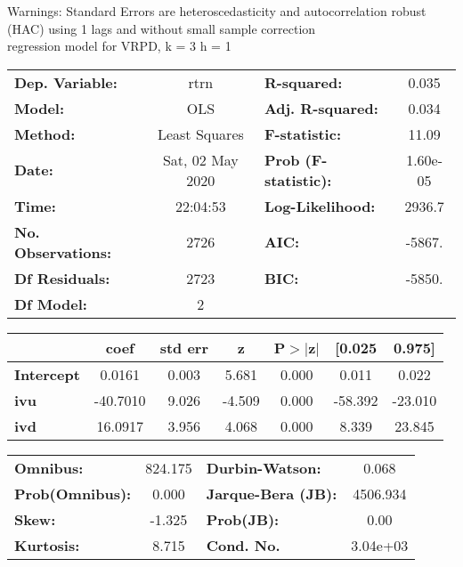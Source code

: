 Warnings: \newline
 [1] Standard Errors are heteroscedasticity and autocorrelation robust (HAC) using 1 lags and without small sample correction\\ 

regression model for VRPD, k = 3 h = 1\begin{center}
\begin{tabular}{lclc}
\toprule
\textbf{Dep. Variable:}    &       rtrn       & \textbf{  R-squared:         } &     0.035   \\
\textbf{Model:}            &       OLS        & \textbf{  Adj. R-squared:    } &     0.034   \\
\textbf{Method:}           &  Least Squares   & \textbf{  F-statistic:       } &     11.09   \\
\textbf{Date:}             & Sat, 02 May 2020 & \textbf{  Prob (F-statistic):} &  1.60e-05   \\
\textbf{Time:}             &     22:04:53     & \textbf{  Log-Likelihood:    } &    2936.7   \\
\textbf{No. Observations:} &        2726      & \textbf{  AIC:               } &    -5867.   \\
\textbf{Df Residuals:}     &        2723      & \textbf{  BIC:               } &    -5850.   \\
\textbf{Df Model:}         &           2      & \textbf{                     } &             \\
\bottomrule
\end{tabular}
\begin{tabular}{lcccccc}
                   & \textbf{coef} & \textbf{std err} & \textbf{z} & \textbf{P$> |$z$|$} & \textbf{[0.025} & \textbf{0.975]}  \\
\midrule
\textbf{Intercept} &       0.0161  &        0.003     &     5.681  &         0.000        &        0.011    &        0.022     \\
\textbf{ivu}       &     -40.7010  &        9.026     &    -4.509  &         0.000        &      -58.392    &      -23.010     \\
\textbf{ivd}       &      16.0917  &        3.956     &     4.068  &         0.000        &        8.339    &       23.845     \\
\bottomrule
\end{tabular}
\begin{tabular}{lclc}
\textbf{Omnibus:}       & 824.175 & \textbf{  Durbin-Watson:     } &    0.068  \\
\textbf{Prob(Omnibus):} &   0.000 & \textbf{  Jarque-Bera (JB):  } & 4506.934  \\
\textbf{Skew:}          &  -1.325 & \textbf{  Prob(JB):          } &     0.00  \\
\textbf{Kurtosis:}      &   8.715 & \textbf{  Cond. No.          } & 3.04e+03  \\
\bottomrule
\end{tabular}
\end{center}

